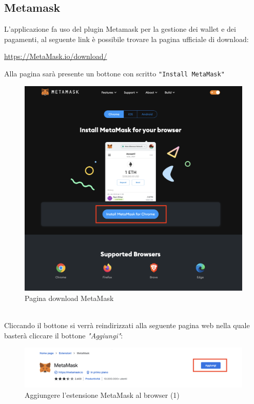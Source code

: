 \subsection{Metamask} \label{subsection:Metamask}

L'applicazione fa uso del plugin Metamask\glo{} per la gestione dei wallet e dei pagamenti, 
al seguente link è possibile trovare la pagina ufficiale di download:
 \begin{center}
     \url{https://MetaMask.io/download/}
 \end{center}
 Alla pagina sarà presente un bottone con scritto \texttt{"Install MetaMask"}
 \begin{figure}[H]
    \centering
    \includegraphics[scale=0.3]{immagini/install-MetaMask.png}
    \caption{Pagina download MetaMask}
\end{figure}
\textbf{}\\
Cliccando il bottone si verrà reindirizzati alla seguente pagina web nella quale basterà cliccare il bottone \textit{"Aggiungi"}:
\begin{figure}[H]
    \centering
    \includegraphics[scale=0.3]{immagini/MetaMaskExtensionPage.png}
    \caption{Aggiungere l'estensione MetaMask al browser (1)}
\end{figure}
